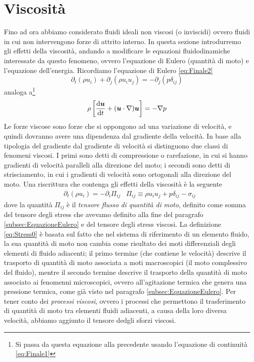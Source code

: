 \section{Viscosità}
Fino ad ora abbiamo considerato fluidi ideali non viscosi (o inviscidi) ovvero fluidi in cui non intervengono forze di attrito interno. In questa sezione introdurremo gli effetti della viscosità, andando a modificare le equazioni fluidodinamiche interessate da questo fenomeno, ovvero l'equazione di Eulero (quantità di moto) e l'equazione dell'energia.
Ricordiamo l'equazione di Eulero \ref{eq:Finale2}
\begin{equation}
\partial_t (\rho u_i) + \partial_j(\rho u_i u_j )= -\partial_j(p\delta_{ij})  
\end{equation}
analoga a\footnote{Si passa da questa equazione alla precedente usando l'equazione di continuità \ref{eq:Finale1}}
\begin{equation}
\rho \left[\der{\V{u}}{t}+(\scal{u}{\nabla})\V{u}\right] = -\Grad p
\end{equation}
Le forze viscose sono forze che si oppongono ad una variazione di velocità, e quindi dovranno avere una dipendenza dal gradiente della velocità. In base alla tipologia del gradiente dal gradiente di velocità si distinguono due classi di fenomeni viscosi. I primi sono detti di compressione o rarefazione, in cui si hanno gradienti di velocità paralleli alla direzione del moto; i secondi sono detti di strisciamento, in cui i gradienti di velocità sono ortogonali alla direzione del moto.
Una riscrittura che contenga gli effetti della viscosità è la seguente
\begin{align}
&\partial_{t}(\rho u_i) = - \partial_i\Pi_{ij}
&\Pi_{ij} \equiv \rho u_iu_j + p\delta_{ij} - \sigma_{ij} \label{eq:Viscosità3}
\end{align}
dove la quantità $\Pi_{ij}$ è il \textit{tensore flusso di quantità di moto}, definito come somma del tensore degli stress che avevamo definito alla fine del paragrafo \ref{subsec:EquazioneEulero} e del tensore degli stress viscosi. La definizione \ref{eq:Stress0} è basata sul fatto che nel sistema di riferimento di un elemento fluido, la sua quantità di moto non cambia come risultato dei moti differenziali degli elementi di fluido adiacenti; il primo termine (che contiene le velocità) descrive il trasporto di quantità di moto associata a moti macroscopici (il moto complessivo del fluido), mentre il secondo termine descrive il trasporto della quantità di moto associato ai fenomenni microscopici, ovvero all'agitazione termica che genera una pressione termica, come già visto nel paragrafo \ref{subsec:EquazioneEulero}. Per tener conto dei \textit{processi viscosi}, ovvero i processi che permettono il trasferimento di quantità di moto tra elementi fluidi adiacenti, a causa della loro diversa velocità, abbiamo aggiunto il tensore dedgli sforzi viscosi.
